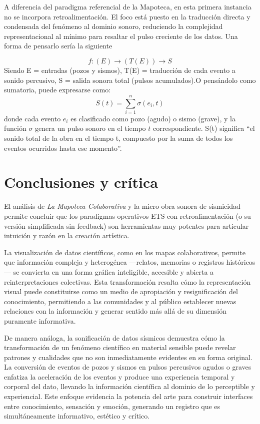 \documentclass[spanish]{report}
\begin{document}
A diferencia del paradigma referencial de la Mapoteca, en esta primera instancia no se incorpora retroalimentación. 
El foco está puesto en la traducción directa y condensada del fenómeno al dominio sonoro, 
reduciendo la complejidad representacional al mínimo para resaltar el pulso creciente de los datos.  
Una forma de pensarlo sería la siguiente

\[
f: (E) \rightarrow (T(E)) \rightarrow S
\]
Siendo 
E = entradas (pozos y sismos),  T(E) = traducción de cada evento a sonido percusivo,  
S = salida sonora total (pulsos acumulados).O pensándolo como sumatoria, puede expresarse como:
\[
S(t) = \sum_{i=1}^{n} \sigma(e_i, t)
\]
donde cada evento \(e_i\) es clasificado como pozo (agudo) o sismo (grave), 
y la función $\sigma$ genera un pulso sonoro en el tiempo $t$ correspondiente.
S(t) significa “el sonido total de la obra en el tiempo t, compuesto por la suma de todos los eventos ocurridos hasta ese momento”.





\section{Conclusiones y crítica}
El análisis de \emph{La Mapoteca Colaborativa} y la micro-obra sonora de sismicidad permite concluir que los paradigmas operativos ETS con retroalimentación (o su versión simplificada sin feedback) son herramientas muy potentes para articular intuición y razón en la creación artística.  

La visualización de datos científicos, como en los mapas colaborativos, permite que información compleja y heterogénea —relatos, memorias o registros históricos— se convierta en una forma gráfica inteligible, accesible y abierta a reinterpretaciones colectivas. Esta transformación resalta cómo la representación visual puede constituirse como un medio de apropiación y resignificación del conocimiento, permitiendo a las comunidades y al público establecer nuevas relaciones con la información y generar sentido más allá de su dimensión puramente informativa.

De manera análoga, la sonificación de datos sísmicos demuestra cómo la transformación de un fenómeno científico en material sensible puede revelar patrones y cualidades que no son inmediatamente evidentes en su forma original. La conversión de eventos de pozos y sismos en pulsos percusivos agudos o graves enfatiza la aceleración de los eventos y produce una experiencia temporal y corporal del dato, llevando la información científica al dominio de lo perceptible y experiencial. Este enfoque evidencia la potencia del arte para construir interfaces entre conocimiento, sensación y emoción, generando un registro que es simultáneamente informativo, estético y crítico.
\end{document}
